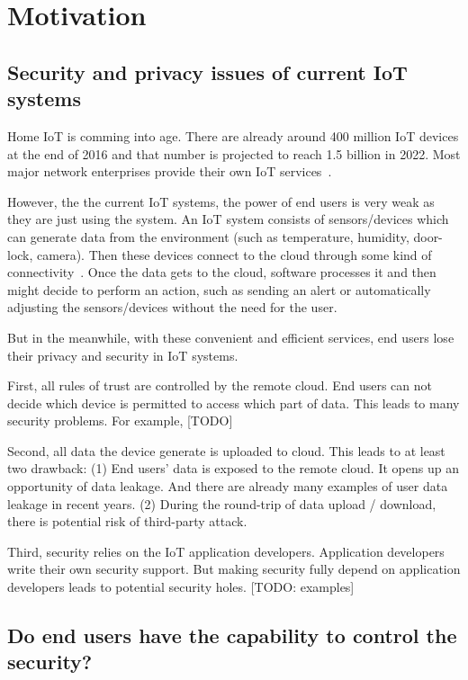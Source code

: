 \section{Motivation}
\subsection{Security and privacy issues of current IoT systems}

Home IoT is comming into age. There are already around 400 million IoT devices at the end of 2016 and that number is projected to reach 1.5 billion in 2022. Most major network enterprises provide their own IoT services~\cite{?}.

However, the the current IoT systems, the power of end users is very weak as they are just using the system. An IoT system consists of sensors/devices which can generate data from the environment (such as temperature, humidity, door-lock, camera). Then these devices connect to the cloud through some kind of connectivity~\cite{?}. Once the data gets to the cloud, software processes it and then might decide to perform an action, such as sending an alert or automatically adjusting the sensors/devices without the need for the user.

But in the meanwhile, with these convenient and efficient services, end users lose their privacy and security in IoT systems. 

First,  all rules of trust are controlled by the remote cloud. End users can not decide which device is permitted to access which part of data. This leads to many security problems. For example, [TODO]

Second, all data the device generate is uploaded to cloud. This leads to at least two drawback: (1) End users' data is exposed to the remote cloud. It opens up an opportunity of data leakage. And there are already many examples of user data leakage in recent years. (2) During the round-trip of data upload / download, there is potential risk of third-party attack.

Third, security relies on the IoT application developers. Application developers write their own security support. But making security fully depend on application developers leads to potential security holes. [TODO: examples]

\subsection{Do end users have the capability to control the security?}

